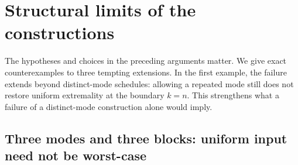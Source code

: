 \section{Structural limits of the constructions}\label{sec:structural-limits}

The hypotheses and choices in the preceding arguments matter. We give
exact counterexamples to three tempting extensions. In the first example,
the failure extends beyond distinct-mode schedules: allowing a repeated
mode still does not restore uniform extremality at the boundary $k=n$.
This strengthens what a failure of a distinct-mode construction alone
would imply.

\subsection{Three modes and three blocks: uniform input need not be worst-case}

